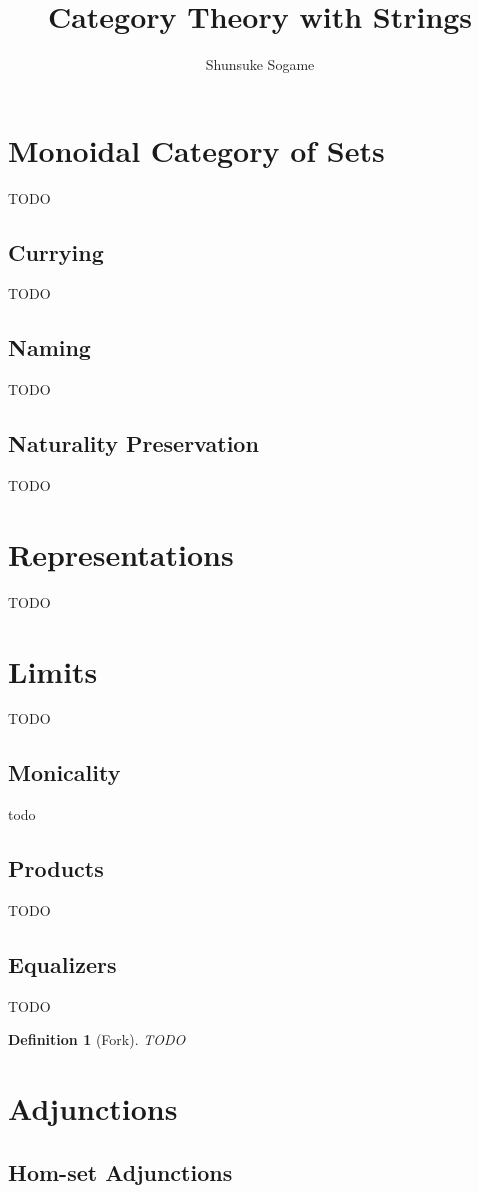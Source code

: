 \documentclass{article}
\title{Category Theory with Strings}
\author{Shunsuke Sogame}
\theoremstyle{break}
\newtheorem{definition}[theorem]{Definition}
\numberwithin{theorem}{section}
\begin{document}
\maketitle












\section{Monoidal Category of Sets}

TODO
\subsection{Currying}

TODO
\subsection{Naming}

TODO
\subsection{Naturality Preservation}

TODO



\section{Representations}
TODO

\section{Limits}
TODO

\subsection{Monicality}
todo

\subsection{Products}
TODO

\subsection{Equalizers}
TODO

\begin{definition}[Fork]
    TODO
\end{definition}


\section{Adjunctions}

\subsection{Hom-set Adjunctions}
\end{document}
